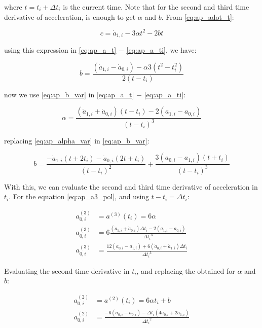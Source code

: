 \begin{appendixs}
	where $t = t_i + \Delta t_i$ is the current time. Note that for the second and third time derivative of acceleration, is enough to get $\alpha$ and $b$. From \ref{eq:ap_adot_t}:
	
	\begin{equation}
		c = \dot{a}_{1, i} - 3 \alpha t^2 - 2bt
	\end{equation}
	
	using this expression in \ref{eq:ap_a_t} $-$ \ref{eq:ap_a_ti}, we have:
	
	\begin{equation}
		b = \frac{(\dot{a}_{1, i} - \dot{a}_{0, i}) - \alpha 3 (t^2 - t_i^2)}{2(t - t_i)} \label{eq:ap_b_var}
	\end{equation}
	
	now we use \ref{eq:ap_b_var} in \ref{eq:ap_a_t} $-$ \ref{eq:ap_a_ti}:
	
	\begin{equation}
		\alpha = \frac{(\dot{a}_{1, i} + \dot{a}_{0, i})(t - t_i) - 2(a_{1, i} - a_{0, i})}{(t - t_i)^3} \label{eq:ap_alpha_var}
	\end{equation}
	
	replacing \ref{eq:ap_alpha_var} in \ref{eq:ap_b_var}:
	
	\begin{equation}
		b = \frac{-\dot{a}_{1, i}(t + 2 t_i) - \dot{a}_{0, i}(2 t + t_i)}{(t - t_i)^2} + \frac{3(a_{0, i} - a_{1, i})(t + t_i)}{(t - t_i)^3}
	\end{equation}
	
	With this, we can evaluate the second and third time derivative of acceleration in $t_i$. For the equation \ref{eq:ap_a3_pol}, and using $t - t_i = \Delta t_i$:
	
	\begin{align}
		a^{(3)}_{0, i} &= a^{(3)} (t_i) = 6 \alpha \\
		a^{(3)}_{0, i} &= 6 \frac{(\dot{a}_{1, i} + \dot{a}_{0, i})\Delta t_i - 2(a_{1, i} - a_{0, i})}{{\Delta t_i}^3} \\
		a^{(3)}_{0, i} &= \frac{12 (a_{0, i} - a_{1, i}) + 6(\dot{a}_{0, i} + \dot{a}_{1, i})\Delta t_i}{{\Delta t_i}^3} \label{eq:ap_a3_ti}
	\end{align}
	
	Evaluating the second time derivative in $t_i$, and replacing the obtained for $\alpha$ and $b$:
	
	\begin{align}
		a^{(2)}_{0, i} &= a^{(2)} (t_i) = 6 \alpha t_i + b \\
		a^{(2)}_{0, i} &= \frac{-6(a_{0, i} - a_{0, i}) - \Delta t_i(4\dot{a}_{0, i} + 2\dot{a}_{1, i})}{{\Delta t_i}^2}
	\end{align}
	

\end{appendixs}
